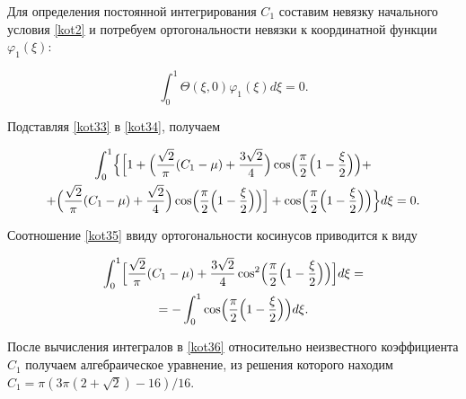 Для определения постоянной интегрирования $C_1$ составим невязку начального условия \eqref{kot2} и потребуем ортогональности невязки к координатной функции $\varphi_1(\xi)$:

\begin{equation}

\label{kot34}

\int_0^1{\Theta(\xi, 0)\varphi_1(\xi)d\xi}=0.

\end{equation}



Подставляя \eqref{kot33} в \eqref{kot34}, получаем

\begin{multline}

\label{kot35}

\int_0^1

\Bigl\{

\Bigl[

1+\Bigl(

\frac{\sqrt{2}}\pi (C_1-\mu)+\frac{3\sqrt{2}}4 

\Bigr)\cos\Bigl(\frac\pi 2\Bigl(1-\frac \xi 2\Bigr)\Bigr)+

\\

+

\Bigl( \frac{\sqrt{2}}\pi (C_1-\mu)+ \frac{\sqrt{2}}4\Bigr)

\cos\Bigl(\frac \pi 2\Bigl(1-\frac \xi2\Bigr)\Bigr)\Bigr]+

\cos\Bigl(\frac \pi 2 \Bigl(1- \frac \xi 2\Bigr) \Bigr) \Bigr\}d\xi=0.

\end{multline}

Соотношение \eqref{kot35} ввиду ортогональности косинусов приводится к виду

\begin{multline}

\label{kot36}

\int_0^1 

\Bigl[

\frac{\sqrt{2}}\pi (C_1-\mu)+ \frac{ 3\sqrt{2}} 4 \cos^2\Bigl(\frac \pi 2 \Bigl(1-\frac \xi 2\Bigr)\Bigr)\Bigr] d\xi= \\ =

-\int_0^1 \cos\Bigl(\frac \pi 2 \Bigl( 1-\frac \xi 2\Bigr)\Bigr)d\xi.

\end{multline}



После вычисления интегралов в \eqref{kot36} относительно неизвестного коэффициента $C_1$ получаем алгебраическое уравнение, из решения которого находим $C_1=\pi(3\pi(2+\sqrt{2})-16)/16$.



